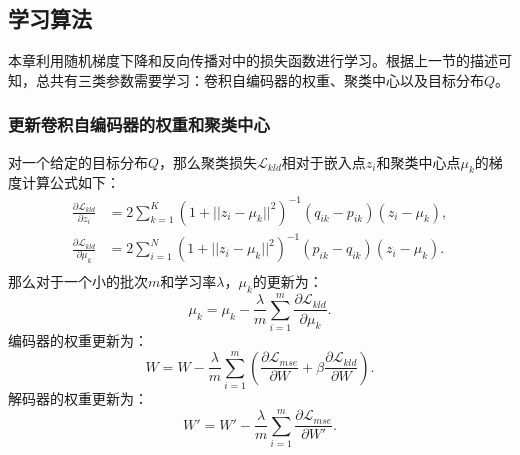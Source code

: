 \subsection{学习算法}
本章利用随机梯度下降和反向传播对中的损失函数进行学习。根据上一节的描述可知，总共有三类参数需要学习：卷积自编码器的权重、聚类中心以及目标分布$Q$。
\subsubsection{更新卷积自编码器的权重和聚类中心}
对一个给定的目标分布$Q$，那么聚类损失$\mathscr{L}_{kld}$相对于嵌入点$z_i$和聚类中心点$\mu_k$的梯度计算公式如下：
\begin{align}
	\frac{\partial \mathscr{L}_{kld}}{\partial z_i} &= 2\sum_{k=1}^K(1+||z_i-\mu_k||^2)^{-1}(q_{ik}-p_{ik})(z_i-\mu_k), \\
	\frac{\partial \mathscr{L}_{kld}}{\partial \mu_k} &= 2\sum_{i=1}^N(1+||z_i-\mu_k||^2)^{-1}(p_{ik}-q_{ik})(z_i-\mu_k). \\
\end{align}
那么对于一个小的批次$m$和学习率$\lambda$，$\mu_k$的更新为：
\begin{equation}
	\mu_k=\mu_k-\frac{\lambda}{m}\sum_{i=1}^m{\frac{\partial \mathscr{L}_{kld}}{\partial \mu_k}}.
\end{equation}
编码器的权重更新为：
\begin{equation}
	W=W-\frac{\lambda}{m}\sum_{i=1}^m(\frac{\partial \mathscr{L}_{mse}}{\partial W} + \beta \frac{\partial \mathscr{L}_{kld}}{\partial W}).
	\label{equ:encoder_update}
\end{equation}
解码器的权重更新为：
\begin{equation}
	W'=W'-\frac{\lambda}{m}\sum_{i=1}^m{\frac{\partial \mathscr{L}_{mse}}{\partial W'}}.
\end{equation}
